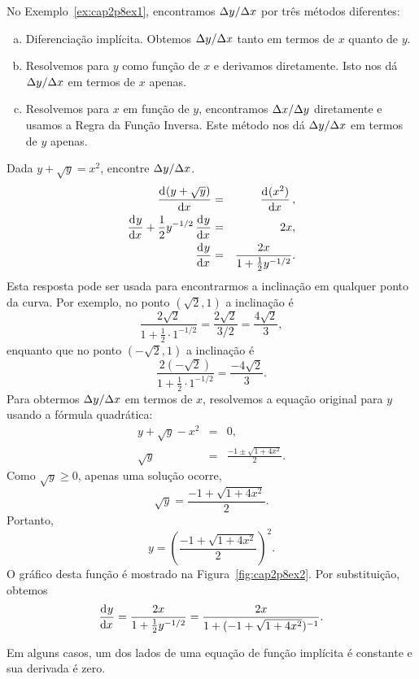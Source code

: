No Exemplo~\ref{ex:cap2p8ex1}, encontramos $\Delta{y}/\Delta{x}$ por três métodos diferentes:
\begin{enumerate}[(a)]
\item Diferenciação implícita. Obtemos $\Delta{y}/\Delta{x}$ tanto em termos de $x$ quanto
de $y$.
\item Resolvemos para $y$ como função de $x$ e derivamos diretamente. Isto nos
dá $\Delta{y}/\Delta{x}$ em termos de $x$ apenas.
\item Resolvemos para $x$ em função de $y$, encontramos $\Delta{x}/\Delta{y}$ diretamente
e usamos a Regra da Função Inversa. Este método nos dá $\Delta{y}/\Delta{x}$ em termos de
$y$ apenas.
\end{enumerate}

\begin{example}
Dada $y + \sqrt{y} = x^2$, encontre $\Delta{y}/\Delta{x}$.
\begin{eqnarray*}
  \dod{(y + \sqrt{y})}{x} & = & \dod{(x^2)}{x}, \\
  \dod y x + \frac{1}{2} y^{-1/2} \dod y x & = & 2x, \\
  \dod y x & = & \frac{2x}{1 + \frac{1}{2}y^{-1/2}}.
\end{eqnarray*}
Esta resposta pode ser usada para encontrarmos a inclinação em qualquer ponto
da curva. Por exemplo, no ponto $(\sqrt{2}, 1)$ a inclinação é
$$
  \frac{2 \sqrt{2}}{1 + \frac{1}{2} \cdot 1^{-1/2}} = \frac{2\sqrt{2}}{3/2} =
  \frac{4 \sqrt{2}}{3},
$$
enquanto que no ponto $(-\sqrt{2}, 1)$ a inclinação é
$$
  \frac{2(-\sqrt{2})}{1 + \frac{1}{2} \cdot 1^{-1/2}} = \frac{-4\sqrt{2}}{3}.
$$
Para obtermos $\Delta{y}/\Delta{x}$ em termos de $x$, resolvemos a equação original para
$y$ usando a fórmula quadrática:
\begin{eqnarray*}
  y + \sqrt{y} - x^2 & = & 0, \\
  \sqrt{y} & = & \frac{-1 \pm \sqrt{1 + 4x^2}}{2}.
\end{eqnarray*}
Como $\sqrt{y} \ge 0$, apenas uma solução ocorre,
$$
  \sqrt{y} = \frac{-1 + \sqrt{1 + 4x^2}}{2}.
$$
Portanto,
$$
  y = \left(\frac{-1 + \sqrt{1 + 4x^2}}{2} \right)^2.
$$
O gráfico desta função é mostrado na Figura~\ref{fig:cap2p8ex2}. Por
substituição, obtemos
$$
  \dod y x = \frac{2x}{1 + \frac{1}{2}y^{-1/2}} =
  \frac{2x}{1 + (-1 + \sqrt{1 + 4x^2})^{-1}}.
$$
\end{example}


Em alguns casos, um dos lados de uma equação de função implícita é constante
e sua derivada é zero.

